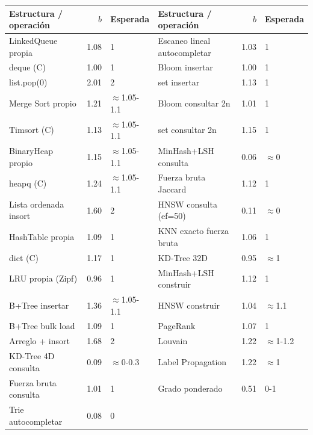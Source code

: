 \setlength{\tabcolsep}{3.5pt}\footnotesize
\begin{tabular}{@{}lrl|lrl@{}}\toprule
Estructura / operación & $b$ & Esperada & Estructura / operación & $b$ & Esperada \\\midrule
LinkedQueue propia & 1.08 & 1 & Escaneo lineal autocompletar & 1.03 & 1 \\
deque (C) & 1.00 & 1 & Bloom insertar & 1.00 & 1 \\
list.pop(0) & 2.01 & 2 & set insertar & 1.13 & 1 \\
Merge Sort propio & 1.21 & $\approx$1.05-1.1 & Bloom consultar 2n & 1.01 & 1 \\
Timsort (C) & 1.13 & $\approx$1.05-1.1 & set consultar 2n & 1.15 & 1 \\
BinaryHeap propio & 1.15 & $\approx$1.05-1.1 & MinHash+LSH consulta & 0.06 & $\approx$0 \\
heapq (C) & 1.24 & $\approx$1.05-1.1 & Fuerza bruta Jaccard & 1.12 & 1 \\
Lista ordenada insort & 1.60 & 2 & HNSW consulta (ef=50) & 0.11 & $\approx$0 \\
HashTable propia & 1.09 & 1 & KNN exacto fuerza bruta & 1.06 & 1 \\
dict (C) & 1.17 & 1 & KD-Tree 32D & 0.95 & $\approx$1 \\
LRU propia (Zipf) & 0.96 & 1 & MinHash+LSH construir & 1.12 & 1 \\
B+Tree insertar & 1.36 & $\approx$1.05-1.1 & HNSW construir & 1.04 & $\approx$1.1 \\
B+Tree bulk load & 1.09 & 1 & PageRank & 1.07 & 1 \\
Arreglo + insort & 1.68 & 2 & Louvain & 1.22 & $\approx$1-1.2 \\
KD-Tree 4D consulta & 0.09 & $\approx$0-0.3 & Label Propagation & 1.22 & $\approx$1 \\
Fuerza bruta consulta & 1.01 & 1 & Grado ponderado & 0.51 & 0-1 \\
Trie autocompletar & 0.08 & 0 & & & \\
\bottomrule\end{tabular}